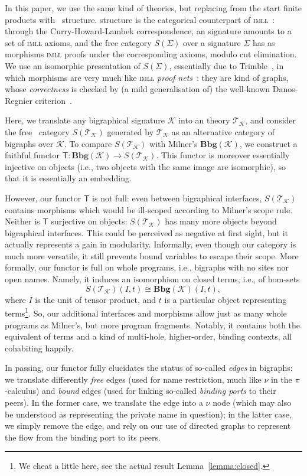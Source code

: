 \documentclass{llncs}
\newcommand{\cat}[1]{\mathbf{#1}}
\newcommand{\fonc}[1]{\mathsf{#1}}
\newcommand{\bsig}{\mathcal{K}} \newcommand{\model}{\mathcal{L}} \newcommand{\bbig}{\cat{Bbg}} \newcommand{\T}{\fonc{T}} \newcommand{\theory}{\mathcal{T}}
\newcommand{\imll}{\textsc{imll}}
\newcommand{\iso}{\cong}
\begin{document}
In this paper, we use the same kind of theories, but replacing from
the start finite products with \smc\ structure.  \smc{} structure is
the categorical counterpart of \imll{}~\cite{ll,Trimble:phd}: through
the Curry-Howard-Lambek correspondence, an \smc{} signature amounts to
a set of \imll{} axioms, and the free \smc{} category $S (\Sigma)$
over a signature $\Sigma$ has as morphisms \imll{} proofs under the
corresponding axioms, modulo cut elimination.  We use an isomorphic
presentation of $S (\Sigma)$, essentially due to
Trimble~\cite{Trimble:phd}, in which morphisms are very much like
\imll{} \emph{proof nets}~\cite{ll}: they are kind of graphs, whose
\emph{correctness} is checked by (a mild generalisation of) the
well-known Danos-Regnier criterion~\cite{Danos:mll}.

Here, we translate any bigraphical signature $\bsig$ into an \smc{}
theory $\theory_\bsig$, and consider the free \smc\ category $S
(\theory_\bsig)$ generated by $\theory_\bsig$ as an alternative
category of bigraphs over $\bsig$.  To compare $S (\theory_\bsig)$
with Milner's $\bbig (\bsig)$, we construct a faithful functor $\T:
\bbig (\bsig) \to S (\theory_\bsig)$. This functor is moreover
essentially injective on objects (i.e., two objects with the same
image are isomorphic), so that it is essentially an embedding.

However, our functor $\T$ is not full: even between bigraphical
interfaces, $S (\theory_\bsig)$ contains morphisms which would be
ill-scoped according to Milner's scope rule. Neither is $\T$
surjective on objects: $S (\theory_\bsig)$ has many more objects
beyond bigraphical interfaces. This could be perceived as negative at
first sight, but it actually represents a gain in
modularity. Informally, even though our category is much more
versatile, it still prevents bound variables to escape their
scope. More formally, our functor is full on whole programs, i.e.,
bigraphs with no sites nor open names. Namely, it induces an
isomorphism on closed terms, i.e., of hom-sets $$S (\theory_\bsig) (I,
t) \iso \bbig (\bsig) (I, t),$$ where $I$ is the unit of tensor
product, and $t$ is a particular object representing terms\footnote{We
  cheat a little here, see the actual result
  Lemma~\ref{lemma:closed}.}.  So, our additional interfaces and
morphisms allow just as many whole programs as Milner's, but more
program fragments. Notably, it contains both the equivalent of terms
and a kind of multi-hole, higher-order, binding contexts, all
cohabiting happily.

In passing, our functor fully elucidates the status of so-called
\emph{edges} in bigraphs: we translate differently \emph{free} edges
(used for name restriction, much like $\nu$ in the $\pi$-calculus) and
\emph{bound} edges (used for linking so-called \emph{binding ports} to
their peers). In the former case, we translate the edge into a $\nu$
node (which may also be understood as representing the private name in
question); in the latter case, we simply remove the edge, and rely on
our use of directed graphs to represent the flow from the binding port
to its peers.
\end{document}
